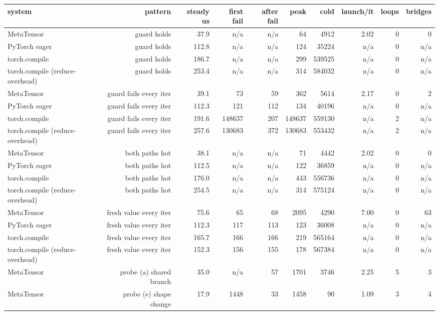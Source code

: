 \begin{tabular}{lrrrrrrrrr}
\toprule
system & pattern & steady us & first fail & after fail & peak & cold & launch/it & loops & bridges \\
\midrule
MetaTensor & guard holds & 37.9 & n/a & n/a & 64 & 4912 & 2.02 & 0 & 0 \\
PyTorch eager & guard holds & 112.8 & n/a & n/a & 124 & 35224 & n/a & 0 & n/a \\
torch.compile & guard holds & 186.7 & n/a & n/a & 299 & 539525 & n/a & 0 & n/a \\
torch.compile (reduce-overhead) & guard holds & 253.4 & n/a & n/a & 314 & 584032 & n/a & 0 & n/a \\
MetaTensor & guard fails every iter & 39.1 & 73 & 59 & 362 & 5614 & 2.17 & 0 & 2 \\
PyTorch eager & guard fails every iter & 112.3 & 121 & 112 & 134 & 40196 & n/a & 0 & n/a \\
torch.compile & guard fails every iter & 191.6 & 148637 & 207 & 148637 & 559130 & n/a & 2 & n/a \\
torch.compile (reduce-overhead) & guard fails every iter & 257.6 & 130683 & 372 & 130683 & 553432 & n/a & 2 & n/a \\
MetaTensor & both paths hot & 38.1 & n/a & n/a & 71 & 4442 & 2.02 & 0 & 0 \\
PyTorch eager & both paths hot & 112.5 & n/a & n/a & 122 & 36859 & n/a & 0 & n/a \\
torch.compile & both paths hot & 176.0 & n/a & n/a & 443 & 556736 & n/a & 0 & n/a \\
torch.compile (reduce-overhead) & both paths hot & 254.5 & n/a & n/a & 314 & 575124 & n/a & 0 & n/a \\
MetaTensor & fresh value every iter & 75.6 & 65 & 68 & 2095 & 4290 & 7.00 & 0 & 63 \\
PyTorch eager & fresh value every iter & 112.3 & 117 & 113 & 123 & 36008 & n/a & 0 & n/a \\
torch.compile & fresh value every iter & 165.7 & 166 & 166 & 219 & 565164 & n/a & 0 & n/a \\
torch.compile (reduce-overhead) & fresh value every iter & 152.3 & 156 & 155 & 178 & 567384 & n/a & 0 & n/a \\
MetaTensor & probe (a) shared branch & 35.0 & n/a & 57 & 1701 & 3746 & 2.25 & 5 & 3 \\
MetaTensor & probe (e) shape change & 17.9 & 1448 & 33 & 1458 & 90 & 1.09 & 3 & 4 \\
\bottomrule
\end{tabular}
